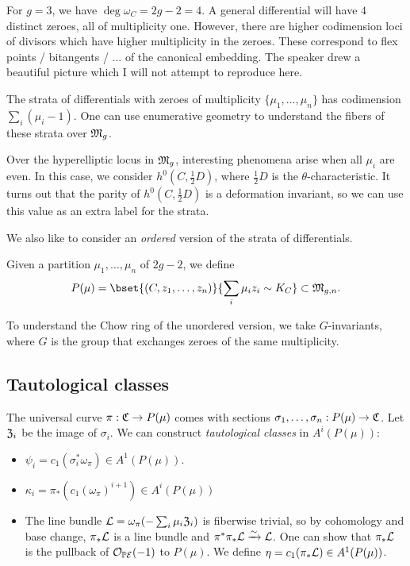\documentclass{article}
\begin{document}
\begin{ex}
	For $g = 3$, we have $\deg \omega_C = 2g - 2 = 4$.
	A general differential will have $4$ distinct zeroes, all of multiplicity one.
	However, there are higher codimension loci of divisors which have higher multiplicity in the zeroes.
	These correspond to flex points / bitangents / ... of the canonical embedding.
	The speaker drew a beautiful picture which I will not attempt to reproduce here.

	The strata of differentials with zeroes of multiplicity $\{ \mu_1, \dots, \mu_n \}$ has codimension $\sum_i (\mu_i - 1)$.
	One can use enumerative geometry to understand the fibers of these strata over $\mathfrak{M}_g$.
	
	Over the hyperelliptic locus in $\mathfrak{M}_g$, interesting phenomena arise when all $\mu_i$ are even.
	In this case, we consider $h^0(C, \frac{1}{2} D)$, where $\frac{1}{2} D$ is the $\theta$-characteristic.
	It turns out that the parity of $h^0(C, \frac{1}{2} D)$ is a deformation invariant, so we can use this value as an extra label for the strata.
\end{ex}

We also like to consider an \emph{ordered} version of the strata of differentials.

\begin{dfn}
	Given a partition $\mu_1, \dots, \mu_n$ of $2g - 2$, we define 
	\[
		P(\mu) = \bset{(C, z_1, \dots, z_n)}{\sum_i \mu_i z_i \sim K_C} \subset \Mfr_{g,n}.
	\]
\end{dfn}

To understand the Chow ring of the unordered version, we take $G$-invariants, where $G$ is the group that exchanges zeroes of the same multiplicity.

\subsection{Tautological classes}

The universal curve $\pi: \mathfrak{C} \to P(\mu)$ comes with sections $\sigma_1, \dots, \sigma_n: P(\mu) \to \mathfrak{C}$.
Let $\mathfrak{Z}_i$ be the image of $\sigma_i$.
We can construct \emph{tautological classes} in $A^i(P(\mu))$:
\begin{itemize}
	\item $\psi_i = c_1(\sigma_i^* \omega_\pi) \in A^1(P(\mu))$.
	\item $\kappa_i = \pi_*(c_1(\omega_\pi)^{i+1}) \in A^i(P(\mu))$
	\item The line bundle $\mathcal{L} = \omega_\pi(-\sum_i \mu_i \mathfrak{Z}_i)$ is fiberwise trivial, so by cohomology and base change, $\pi_* \mathcal{L}$ is a line bundle and $\pi^* \pi_* \mathcal{L} \xrightarrow{\sim} \mathcal{L}$.
		One can show that $\pi_* \mathcal{L}$ is the pullback of $\mathcal{O}_{\mathbb{P} \mathcal{E}}(-1)$ to $P(\mu)$.
		We define $\eta = c_1(\pi_* \mathcal{L}) \in A^1(P(\mu))$.
\end{itemize}
\end{document}

